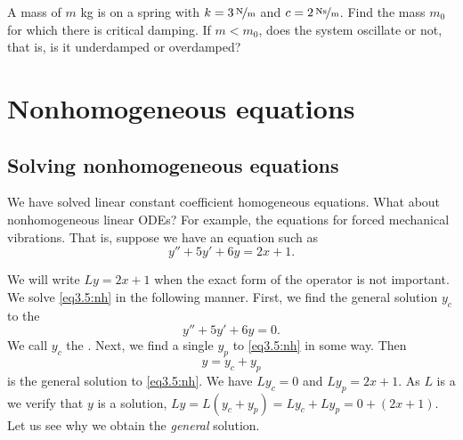 \begin{exercise}
A mass of $m$ \unit{kg} is on a spring with $k=\unitfrac[3]{N}{m}$ and
$c=\unitfrac[2]{Ns}{m}$.  Find the mass $m_0$ for which there is critical
damping.  If $m < m_0$, does the system oscillate or not, that is, is it
underdamped or overdamped?
\end{exercise}


\sectionnewpage
\section{Nonhomogeneous equations}
\label{sec:nonhom}



\subsection{Solving nonhomogeneous equations}

We have solved linear constant coefficient homogeneous 
equations.
What about nonhomogeneous linear ODEs?
For example, the equations for forced mechanical vibrations.
That is, suppose we have an equation such as
\begin{equation} \label{eq3.5:nh}
y'' + 5y'+ 6y = 2x+1 .
\end{equation}

We will write $Ly = 2x+1$ when the exact form of the operator is not
important.
We solve \eqref{eq3.5:nh} in the following manner.  First, we find the general
solution $y_c$
to the \emph{}
\begin{equation} \label{eq3.5:h}
y'' + 5y'+ 6y = 0 .
\end{equation}
We call $y_c$ the \emph{}.
Next, we find a
single \emph{} $y_p$ to \eqref{eq3.5:nh} in some
way.  Then
\begin{equation*}
y = y_c + y_p
\end{equation*}
is the general solution to \eqref{eq3.5:nh}.  
We have $L y_c = 0$ and $L y_p = 2x+1$.  As
$L$ is a \emph{}
we verify that $y$ is a solution, $L y = L ( y_c + y_p) = L y_c + L y_p = 0
+ (2x+1)$.  Let us see
why we obtain the \emph{general} solution.

